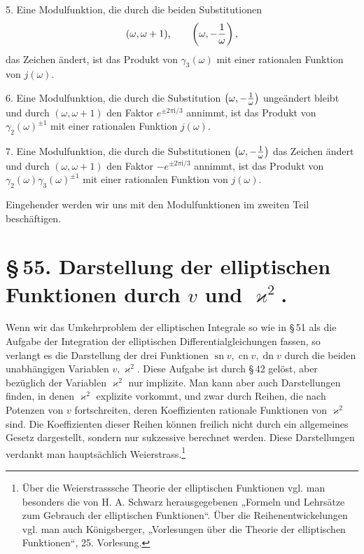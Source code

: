 \documentclass[11pt]{article}
\providecommand{\sn}{\operatorname{sn}}
\providecommand{\cn}{\operatorname{cn}}
\providecommand{\dn}{\operatorname{dn}}
\providecommand{\ii}{\mathrm{i}}
\begin{document}
5. Eine Modulfunktion, die durch die beiden Substitutionen
\[
(\omega,\omega+1),
\qquad
\left(\omega,-{1\over\omega}\right),
\]
das Zeichen ändert, ist das Produkt von $\gamma_3(\omega)$ mit einer rationalen Funktion von $j(\omega)$.

6. Eine Modulfunktion, die durch die Substitution $\left(\omega,-{1\over\omega}\right)$ ungeändert bleibt und durch $(\omega,\omega+1)$ den Faktor $e^{\pm2\pi\ii/3}$ annimmt, ist das Produkt von $\gamma_2(\omega)^{\pm1}$ mit einer rationalen Funktion $j(\omega)$.

7. Eine Modulfunktion, die durch die Substitutionen $\left(\omega,-{1\over\omega}\right)$ das Zeichen ändert und durch $(\omega,\omega+1)$ den Faktor $-e^{\pm2\pi\ii/3}$ annimmt, ist das Produkt von $\gamma_2(\omega)\gamma_3(\omega)^{\pm1}$ mit einer rationalen Funktion von $j(\omega)$.

Eingehender werden wir uns mit den Modulfunktionen im zweiten Teil beschäftigen.

\section*{\S\,55. Darstellung der elliptischen Funktionen durch $v$ und $\varkappa^2$.}

Wenn wir das Umkehrproblem der elliptischen Integrale so wie in \S\,51 als die Aufgabe der Integration der elliptischen Differentialgleichungen fassen, so verlangt es die Darstellung der drei Funktionen $\sn v,\cn v,\dn v$ durch die beiden unabhängigen Variablen $v,\varkappa^2$. Diese Aufgabe ist durch \S\,42 gelöst, aber bezüglich der Variablen $\varkappa^2$ nur implizite. Man kann aber auch Darstellungen finden, in denen $\varkappa^2$ explizite vorkommt, und zwar durch Reihen, die nach Potenzen von $v$ fortschreiten, deren Koeffizienten rationale Funktionen von $\varkappa^2$ sind. Die Koeffizienten dieser Reihen können freilich nicht durch ein allgemeines Gesetz dargestellt, sondern nur sukzessive berechnet werden. Diese Darstellungen verdankt man hauptsächlich Weierstrass.\footnote{Über die Weierstrasssche Theorie der elliptischen Funktionen vgl. man besonders die von H. A. Schwarz herausgegebenen „Formeln und Lehrsätze zum Gebrauch der elliptischen Funktionen“. Über die Reihenentwickelungen vgl. man auch Königsberger, „Vorlesungen über die Theorie der elliptischen Funktionen“, 25. Vorlesung.}
\end{document}
